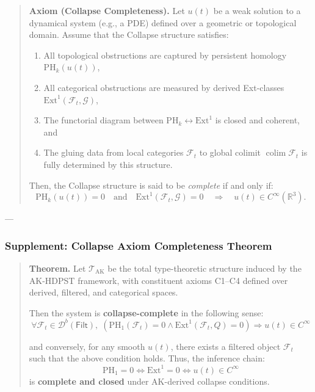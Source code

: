 \documentclass[11pt]{article}
\DeclareMathOperator{\colim}{colim}
\begin{document}
\begin{axiom}
\begin{axiom}
{{\begin{quote}
\textbf{Axiom (Collapse Completeness).}  
Let \( u(t) \) be a weak solution to a dynamical system (e.g., a PDE) defined over a geometric or topological domain.  
Assume that the Collapse structure satisfies:

\begin{enumerate}
  \item All topological obstructions are captured by persistent homology \(\mathrm{PH}_k(u(t))\),
  \item All categorical obstructions are measured by derived Ext-classes \(\mathrm{Ext}^1(\mathcal{F}_t, \mathcal{G})\),
  \item The functorial diagram between \(\mathrm{PH}_k \leftrightarrow \mathrm{Ext}^1\) is closed and coherent, and
  \item The gluing data from local categories \(\mathcal{F}_t\) to global colimit \(\colim \mathcal{F}_t\) is fully determined by this structure.
\end{enumerate}

Then, the Collapse structure is said to be \emph{complete} if and only if:
\[
\mathrm{PH}_k(u(t)) = 0 \quad \text{and} \quad \mathrm{Ext}^1(\mathcal{F}_t, \mathcal{G}) = 0 \quad \Longrightarrow \quad u(t) \in C^\infty(\mathbb{R}^3).
\]
\end{quote}

---

\subsubsection*{Supplement: Collapse Axiom Completeness Theorem}

\begin{quote}
\textbf{Theorem.}  
Let \( \mathcal{T}_{\text{AK}} \) be the total type-theoretic structure induced by the AK-HDPST framework,  
with constituent axioms C1–C4 defined over derived, filtered, and categorical spaces.

Then the system is \textbf{collapse-complete} in the following sense:
\[
\forall \mathcal{F}_t \in \mathcal{D}^b(\mathsf{Filt}),\;
\left( \mathrm{PH}_1(\mathcal{F}_t) = 0 \land \mathrm{Ext}^1(\mathcal{F}_t, Q) = 0 \right)
\Rightarrow u(t) \in C^\infty
\]

and conversely, for any smooth \( u(t) \), there exists a filtered object \( \mathcal{F}_t \) such that the above condition holds.  
Thus, the inference chain:
\[
\mathrm{PH}_1 = 0 \Leftrightarrow \mathrm{Ext}^1 = 0 \Leftrightarrow u(t) \in C^\infty
\]
is \textbf{complete and closed} under AK-derived collapse conditions.
\end{quote}

}}
\end{axiom}
\end{axiom}
\end{document}

